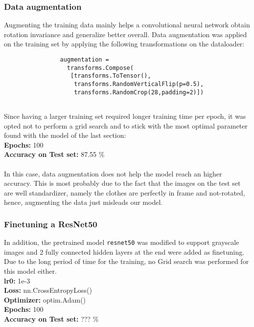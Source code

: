 \documentclass[11pt,a4paper,twocolumn]{IEEEtran}
\newcommand{\thinnersepline}{\noindent\makebox[\linewidth]{\rule{7.5cm}{0.01pt}}}
\begin{document}
			\subsubsection{Data augmentation}
			Augmenting the training data mainly helps a convolutional neural network obtain rotation invariance and generalize better overall.
			Data augmentation was applied on the training set by applying the following transformations on the dataloader:\\
			\begin{verbatim}
				augmentation = 
				  transforms.Compose(
				   [transforms.ToTensor(),
				    transforms.RandomVerticalFlip(p=0.5),
				    transforms.RandomCrop(28,padding=2)])
				
			\end{verbatim}
			Since having a larger training set required longer training time per epoch, it was opted not to perform a grid search and to stick with the most optimal parameter found with the model of the last section:
			\thinnersepline\\
			\textbf{Epochs:} 100\\
			\textbf{Accuracy on Test set:} 87.55 \%\vspace*{-.2cm}\\
			\thinnersepline\\
			In this case, data augmentation does not help the model reach an higher accuracy. This is most probably due to the fact that the images on the test set are well standardizer, namely the clothes are perfectly in frame and not-rotated, hence, augmenting the data just misleads our model. \medskip\\
			\subsubsection{Finetuning a ResNet50}
			In addition, the pretrained model \texttt{resnet50} was modified to support grayscale images and 2 fully connected hidden layers at the end were added as finetuning.\\
			Due to the long period of time for the training, no Grid search was performed for this model either.
			\thinnersepline\\
			\textbf{lr0:} 1e-3\\
			\textbf{Loss:} nn.CrossEntropyLoss()\\
			\textbf{Optimizer:} optim.Adam() \\
			\textbf{Epochs:} 100 \\
			\textbf{Accuracy on Test set:} ??? \%\vspace*{-.2cm}\\
			\thinnersepline\\
			
\end{document}
